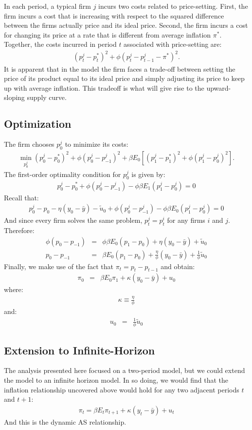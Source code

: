 \documentclass[12pt,fleqn]{article}
\newcommand{\EE}{\begin{eqnarray}}
\newcommand{\FF}{\end{eqnarray}}
\begin{document}
\begin{appendix}
In each period, a typical firm $j$ incurs two costs related to price-setting. First, the firm incurs a cost that is increasing with respect to the squared difference between the firms actually price and its ideal price. Second, the firm incurs a cost for changing its price at a rate that is different from average inflation $\pi^*$. Together, the costs incurred in period $t$ associated with price-setting are:
	\EE
	\left( p_t^j - p^*_t\right)^2 + \phi \left(p^j_t - p^j_{t-1}-\pi^*\right)^2.
	\FF
It is apparent that in the model the firm faces a trade-off between setting the price of its product equal to its ideal price and simply adjusting its price to keep up with average inflation. This tradeoff is what will give rise to the upward-sloping supply curve.
	
\subsection{Optimization}

The firm chooses $p^j_0$ to minimize its costs:
	\EE
	\min_{p_0^j} \left( p_0^j - p^*_0\right)^2 + \phi \left(p_0^j - p_{-1}^j\right)^2 + \beta E_0\left[\left( p_1^j - p^*_1\right)^2 + \phi \left(p_1^j - p_{0}^j\right)^2\right].
	\FF
The first-order optimality condition for $p_0^j$ is given by:
	\EE
	p_0^j - p^*_0 + \phi \left(p_0^j - p_{-1}^j\right) - \phi \beta E_1\left(p_1^j - p_{0}^j\right) = 0
	\FF
Recall that:
	\EE
	p_0^j - p_0 - \eta ( y_0-\bar{y}) - \tilde{u}_0 + \phi \left(p_0^j - p_{-1}^j\right) - \phi \beta E_0\left(p_1^j - p_{0}^j\right) = 0
	\FF
And since every firm solves the same problem, $p_t^j = p_t^i$ for any firms $i$ and $j$. Therefore:
	\EE
	\phi\left(p_0 - p_{-1}\right)  & = & \phi \beta E_0\left(p_1 - p_{0}\right) + \eta (y_0-\bar{y}) + \tilde{u}_0\\
	p_0 - p_{-1}  & = & \beta E_0\left(p_1 - p_{0}\right) + \frac{\eta}{\phi} (y_0-\bar{y}) + \frac{1}{\phi}\tilde{u}_0
	\FF
Finally, we make use of the fact that $\pi_t = p_t - p_{t-1}$ and obtain:
	\EE
	\pi_0 & = & \beta E_0\pi_1 + \kappa (y_0-\bar{y})  + u_0
	\FF
where:
	\EE
	\kappa \equiv \frac{\eta}{\phi}
	\FF
and:
	\EE
	u_{0} & = & \frac{1}{\phi}\tilde{u}_0
	\FF
	
\subsection{Extension to Infinite-Horizon}

The analysis presented here focused on a two-period model, but we could extend the model to an infinite horizon model. In so doing, we would find that the inflation relationship uncovered above would hold for any two adjacent periods $t$ and $t+1$:
	\EE
	\boxed{\pi_t = \beta E_t\pi_{t+1} + \kappa (y_t - \bar{y}) + u_t}
	\FF
And this is the dynamic AS relationship.


\end{appendix}
\end{document}
